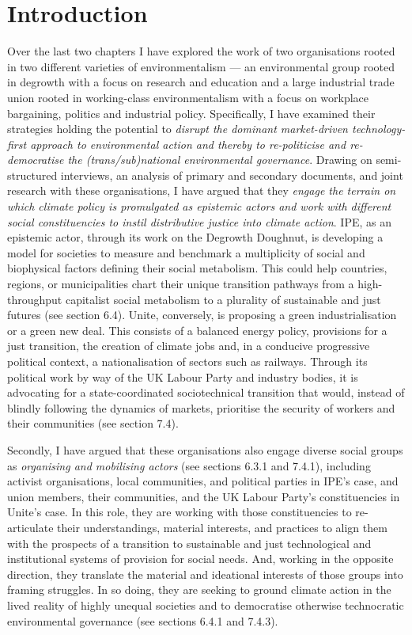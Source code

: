 \documentclass[a4paper, nobind]{templates/ociamthesis}
\begin{document}
\minitoc

\hypertarget{introduction-1}{%
\section{Introduction}\label{introduction-1}}

Over the last two chapters I have explored the work of two organisations rooted in two different varieties of environmentalism --- an environmental group rooted in degrowth with a focus on research and education and a large industrial trade union rooted in working-class environmentalism with a focus on workplace bargaining, politics and industrial policy. Specifically, I have examined their strategies holding the potential to \emph{disrupt the dominant market-driven technology-first approach to environmental action and thereby to re-politicise and re-democratise the (trans/sub)national environmental governance}. Drawing on semi-structured interviews, an analysis of primary and secondary documents, and joint research with these organisations, I have argued that they \emph{engage the terrain on which climate policy is promulgated as epistemic actors and work with different social constituencies to instil distributive justice into climate action}. IPE, as an epistemic actor, through its work on the Degrowth Doughnut, is developing a model for societies to measure and benchmark a multiplicity of social and biophysical factors defining their social metabolism. This could help countries, regions, or municipalities chart their unique transition pathways from a high-throughput capitalist social metabolism to a plurality of sustainable and just futures (see section 6.4). Unite, conversely, is proposing a green industrialisation or a green new deal. This consists of a balanced energy policy, provisions for a just transition, the creation of climate jobs and, in a conducive progressive political context, a nationalisation of sectors such as railways. Through its political work by way of the UK Labour Party and industry bodies, it is advocating for a state-coordinated sociotechnical transition that would, instead of blindly following the dynamics of markets, prioritise the security of workers and their communities (see section 7.4).

Secondly, I have argued that these organisations also engage diverse social groups as \emph{organising and mobilising actors} (see sections 6.3.1 and 7.4.1), including activist organisations, local communities, and political parties in IPE's case, and union members, their communities, and the UK Labour Party's constituencies in Unite's case. In this role, they are working with those constituencies to re-articulate their understandings, material interests, and practices to align them with the prospects of a transition to sustainable and just technological and institutional systems of provision for social needs. And, working in the opposite direction, they translate the material and ideational interests of those groups into framing struggles. In so doing, they are seeking to ground climate action in the lived reality of highly unequal societies and to democratise otherwise technocratic environmental governance (see sections 6.4.1 and 7.4.3).
\end{document}
